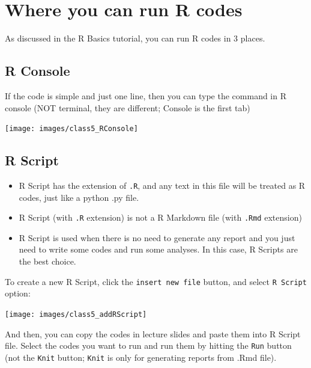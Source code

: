 \documentclass[
  11pt,
]{book}
\begin{document}
\hypertarget{where-you-can-run-r-codes}{%
\section{Where you can run R codes}\label{where-you-can-run-r-codes}}

As discussed in the R Basics tutorial, you can run R codes in 3 places.

\hypertarget{r-console}{%
\subsection{R Console}\label{r-console}}

If the code is simple and just one line, then you can type the command in R console (NOT terminal, they are different; Console is the first tab)

\begin{center}\texttt{[image: images/class5\_RConsole]} \end{center}

\hypertarget{r-script}{%
\subsection{R Script}\label{r-script}}

\begin{itemize}
\item
  R Script has the extension of \texttt{.R}, and any text in this file will be treated as R codes, just like a python .py file.
\item
  R Script (with \texttt{.R} extension) is not a R Markdown file (with \texttt{.Rmd} extension)
\item
  R Script is used when there is no need to generate any report and you just need to write some codes and run some analyses. In this case, R Scripts are the best choice.
\end{itemize}

To create a new R Script, click the \texttt{insert\ new\ file} button, and select \texttt{R\ Script} option:

\begin{center}\texttt{[image: images/class5\_addRScript]} \end{center}

And then, you can copy the codes in lecture slides and paste them into R Script file.
Select the codes you want to run and run them by hitting the \texttt{Run} button (not the \texttt{Knit} button; \texttt{Knit} is only for generating reports from .Rmd file).
\end{document}
